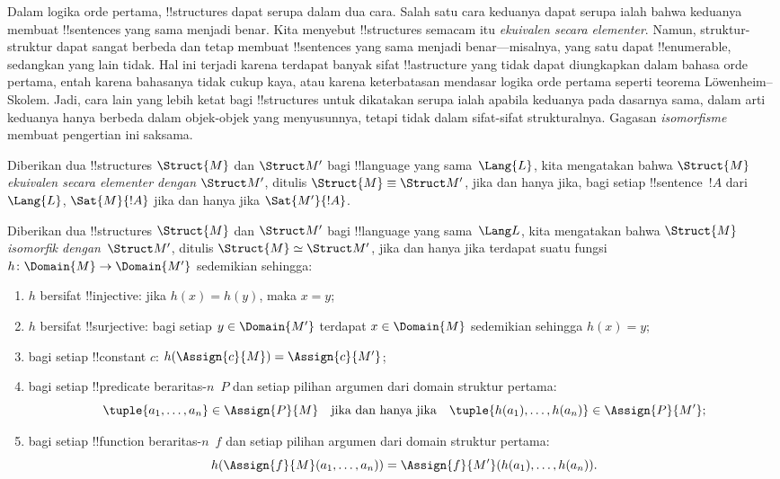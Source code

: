 \documentclass[../../../include/open-logic-section]{subfiles}
\begin{document}

Dalam logika orde pertama, !!{structure}s dapat serupa dalam dua cara. Salah
satu cara keduanya dapat serupa ialah bahwa keduanya membuat !!{sentence}s yang sama
menjadi benar. Kita menyebut !!{structure}s semacam itu \emph{ekuivalen
secara elementer}. Namun, struktur-struktur dapat sangat berbeda dan tetap
membuat !!{sentence}s yang sama menjadi benar---misalnya, yang satu dapat
!!{enumerable}, sedangkan yang lain tidak. Hal ini terjadi karena terdapat
banyak sifat !!a{structure} yang tidak dapat diungkapkan dalam bahasa orde
pertama, entah karena bahasanya tidak cukup kaya, atau karena keterbatasan
mendasar logika orde pertama seperti teorema L\"owenheim--Skolem. Jadi, cara
lain yang lebih ketat bagi !!{structure}s untuk dikatakan serupa ialah apabila
keduanya pada dasarnya sama, dalam arti keduanya hanya berbeda dalam
objek-objek yang menyusunnya, tetapi tidak dalam sifat-sifat strukturalnya.
Gagasan \emph{isomorfisme} membuat pengertian ini saksama.

\begin{defn}
Diberikan dua !!{structure}s $\Struct{M}$ dan $\Struct M'$ bagi
!!{language} yang sama~$\Lang{L}$, kita mengatakan bahwa $\Struct{M}$
\emph{ekuivalen secara elementer dengan} $\Struct M'$, ditulis
$\Struct{M} \equiv \Struct M'$, jika dan hanya jika, bagi setiap
!!{sentence}~$!A$ dari~$\Lang{L}$, $\Sat{M}{!A}$ jika dan hanya jika
$\Sat{M'}{!A}$.
\end{defn}

\begin{defn}
 Diberikan dua !!{structure}s $\Struct{M}$ dan
$\Struct M'$ bagi !!{language} yang sama~$\Lang L$, kita mengatakan bahwa
$\Struct{M}$ \emph{isomorfik dengan}~$\Struct M'$, ditulis $\Struct{M}
\simeq \Struct M'$, jika dan hanya jika terdapat suatu fungsi $h \colon
\Domain{M} \to \Domain{M'}$ sedemikian sehingga:
\begin{enumerate}
\item $h$ bersifat !!{injective}: jika $h(x) = h(y)$, maka $x = y$;
\item $h$ bersifat !!{surjective}: bagi setiap $y \in \Domain{M'}$
  terdapat $x \in \Domain{M}$ sedemikian sehingga $h(x) = y$;
\item {}bagi setiap !!{constant} $c$:
  $h(\Assign{c}{M}) = \Assign{c}{M'}$;
\item {}bagi setiap !!{predicate} beraritas-$n$~$P$
  dan setiap pilihan argumen dari domain struktur pertama:
  \[
  \tuple{a_1, \dots, a_n}\in \Assign{P}{M} \quad\text{jika dan hanya jika}\quad
  \tuple{h(a_1), \dots, h(a_n)} \in \Assign{P}{M'};
  \]
\item {}bagi setiap !!{function} beraritas-$n$~$f$
  dan setiap pilihan argumen dari domain struktur pertama:
  \[
  h(\Assign{f}{M}(a_1, \dots, a_n)) =
  \Assign{f}{M'}(h(a_1), \dots, h(a_n)).
  \]
\end{enumerate}
\end{defn}
\end{document}
